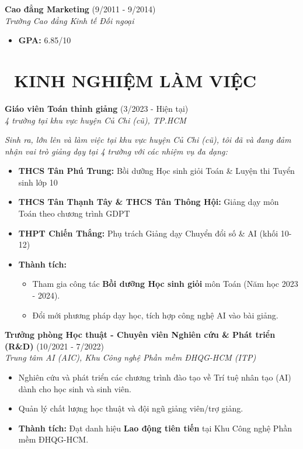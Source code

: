\documentclass[11pt,a4paper]{article}
\begin{document}
\textbf{Cao đẳng Marketing} \hfill (9/2011 - 9/2014)\\
\textit{Trường Cao đẳng Kinh tế Đối ngoại}
\begin{itemize}
    \item \textbf{GPA:} 6.85/10
\end{itemize}

\section{\faBriefcase~KINH NGHIỆM LÀM VIỆC}

\textbf{Giáo viên Toán thỉnh giảng} \hfill (3/2023 - Hiện tại)\\
\textit{4 trường tại khu vực huyện Củ Chi (cũ), TP.HCM}

\textit{Sinh ra, lớn lên và làm việc tại khu vực huyện Củ Chi (cũ), tôi đã và đang đảm nhận vai trò giảng dạy tại 4 trường với các nhiệm vụ đa dạng:}
\begin{itemize}
    \item \textbf{THCS Tân Phú Trung:} Bồi dưỡng Học sinh giỏi Toán \& Luyện thi Tuyển sinh lớp 10
    \item \textbf{THCS Tân Thạnh Tây \& THCS Tân Thông Hội:} Giảng dạy môn Toán theo chương trình GDPT
    \item \textbf{THPT Chiến Thắng:} Phụ trách Giảng dạy Chuyển đổi số \& AI (khối 10-12)
    \item \textbf{Thành tích:}
    \begin{itemize}
        \item Tham gia công tác \textbf{Bồi dưỡng Học sinh giỏi} môn Toán (Năm học 2023 - 2024).
        \item Đổi mới phương pháp dạy học, tích hợp công nghệ AI vào bài giảng.
    \end{itemize}
\end{itemize} 

\textbf{Trưởng phòng Học thuật - Chuyên viên Nghiên cứu \& Phát triển (R\&D)} \hfill (10/2021 - 7/2022)\\
\textit{Trung tâm AI (AIC), Khu Công nghệ Phần mềm ĐHQG-HCM (ITP)}
\begin{itemize}
    \item Nghiên cứu và phát triển các chương trình đào tạo về Trí tuệ nhân tạo (AI) dành cho học sinh và sinh viên.
    \item Quản lý chất lượng học thuật và đội ngũ giảng viên/trợ giảng.
    \item \textbf{Thành tích:} Đạt danh hiệu \textbf{Lao động tiên tiến} tại Khu Công nghệ Phần mềm ĐHQG-HCM.
\end{itemize}
\end{document}
